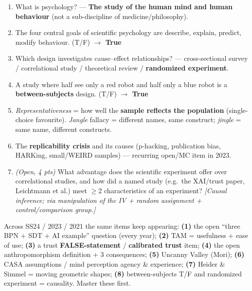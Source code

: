\documentclass[11pt, oneside]{book}
\begin{document}
\begin{enumerate}[leftmargin=1.6em, itemsep=4pt]
\item What is psychology? — \textbf{The study of the human mind and human
behaviour} (not a sub-discipline of medicine/philosophy).
\item The four central goals of scientific psychology are describe, explain,
predict, modify behaviour. (T/F) \hfill\textbf{$\to$ True}
\item Which design investigates cause--effect relationships? — cross-sectional
survey / correlational study / theoretical review / \textbf{randomized
experiment}.
\item A study where half see only a red robot and half only a blue robot is a
\textbf{between-subjects} design. (T/F) \hfill\textbf{$\to$ True}
\item \emph{Representativeness} = how well the \textbf{sample reflects the
population} (single-choice favourite). \emph{Jangle} fallacy = different names,
same construct; \emph{jingle} = same name, different constructs.
\item The \textbf{replicability crisis} and its causes (p-hacking, publication
bias, HARKing, small/WEIRD samples) — recurring open/MC item in 2023.
\item \emph{(Open, 4 pts)} What advantage does the scientific experiment offer
over correlational studies, and how did a named study (e.g.\ the XAI/trust
paper, Leichtmann et al.) meet $\ge$2 characteristics of an experiment?
\emph{[Causal inference; via manipulation of the IV + random assignment +
control/comparison group.]}
\end{enumerate}

\begin{notebox}[title={Highest-yield, confirmed-recurring questions}]
Across SS24 / 2023 / 2021 the same items keep appearing: \textbf{(1)} the
open ``three BPN + SDT + AI example'' question (every year); \textbf{(2)} TAM =
usefulness + ease of use; \textbf{(3)} a trust \textbf{FALSE-statement} /
\textbf{calibrated trust} item; \textbf{(4)} the open anthropomorphism
definition + 3 consequences; \textbf{(5)} Uncanny Valley (Mori);
\textbf{(6)} CASA assumptions / mind perception agency \& experience;
\textbf{(7)} Heider \& Simmel = moving geometric shapes; \textbf{(8)}
between-subjects T/F and randomized experiment = causality. Master these first.
\end{notebox}
\end{document}
